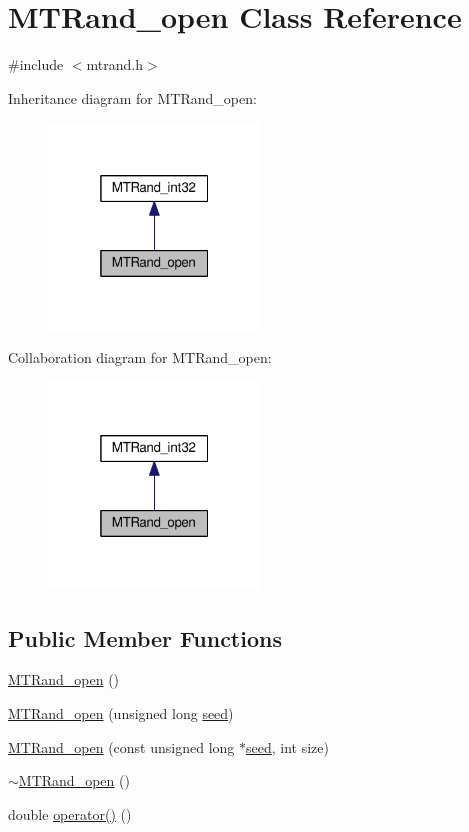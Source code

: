 \hypertarget{a00020}{\section{M\-T\-Rand\-\_\-open Class Reference}
\label{a00020}
}


{\ttfamily \#include $<$mtrand.\-h$>$}



Inheritance diagram for M\-T\-Rand\-\_\-open\-:\nopagebreak
\begin{figure}[H]
\begin{center}
\leavevmode
\includegraphics[width=160pt]{a00108}
\end{center}
\end{figure}


Collaboration diagram for M\-T\-Rand\-\_\-open\-:\nopagebreak
\begin{figure}[H]
\begin{center}
\leavevmode
\includegraphics[width=160pt]{a00109}
\end{center}
\end{figure}
\subsection*{Public Member Functions}
\begin{DoxyCompactItemize}
\item 
\hyperlink{a00020_a58140b54564be39382da163954177389}{M\-T\-Rand\-\_\-open} ()
\item 
\hyperlink{a00020_a1f55ebc1052f5343f8d6e08a752ef957}{M\-T\-Rand\-\_\-open} (unsigned long \hyperlink{a00019_a0c57076fe30358e0700a7ce1baa0ea27}{seed})
\item 
\hyperlink{a00020_a0216992f4dfa5acf22ee8c585eeac488}{M\-T\-Rand\-\_\-open} (const unsigned long $\ast$\hyperlink{a00019_a0c57076fe30358e0700a7ce1baa0ea27}{seed}, int size)
\item 
\hyperlink{a00020_a4f4774b5d9b79972dedaec984b248581}{$\sim$\-M\-T\-Rand\-\_\-open} ()
\item 
double \hyperlink{a00020_ac408aa400ca59fc2afc888d88f98d807}{operator()} ()
\end{DoxyCompactItemize}
